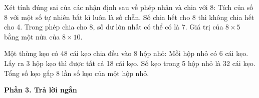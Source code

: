 \begin{ex} %
Xét tính đúng sai của các nhận định sau về phép nhân và chia với 8:
\choiceTF
{\True Tích của số 8 với một số tự nhiên bất kì luôn là số chẵn.}
{Số chia hết cho 8 thì không chia hết cho 4.}
{\True Trong phép chia cho 8, số dư lớn nhất có thể có là 7.}
{\True Giá trị của $8 \times 5$ bằng một nửa của $8 \times 10$.}
\end{ex}

\begin{ex} %
Một thùng kẹo có 48 cái kẹo chia đều vào 8 hộp nhỏ:
\choiceTF
{\True Mỗi hộp nhỏ có 6 cái kẹo.}
{\True Lấy ra 3 hộp kẹo thì được tất cả 18 cái kẹo.}
{Số kẹo trong 5 hộp nhỏ là 32 cái kẹo.}
{\True Tổng số kẹo gấp 8 lần số kẹo của một hộp nhỏ.}
\end{ex}

\textbf{Phần 3. Trả lời ngắn}

